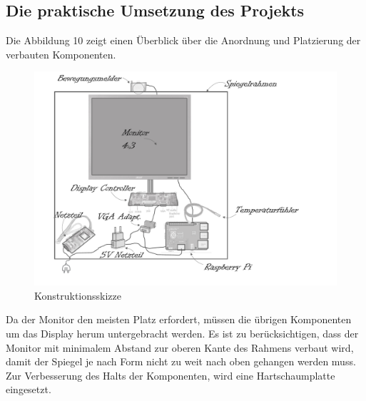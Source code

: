 \subsection{Die praktische Umsetzung des Projekts}
Die Abbildung 10 zeigt einen Überblick über die Anordnung und Platzierung der verbauten Komponenten. 
\begin{figure}
	\includegraphics[scale=0.5, trim=0mm 10mm 60mm 10mm]{bilder/smartMirrorExplosionsskizze.pdf}
	\caption{Konstruktionsskizze}
\end{figure}
Da der Monitor den meisten Platz erfordert, müssen die übrigen Komponenten um das Display herum untergebracht werden. Es ist zu berücksichtigen, dass der Monitor mit  minimalem Abstand zur oberen Kante des Rahmens verbaut wird, damit der Spiegel je nach Form nicht zu weit nach oben gehangen werden muss. Zur Verbesserung des Halts der Komponenten, wird eine Hartschaumplatte eingesetzt. 


